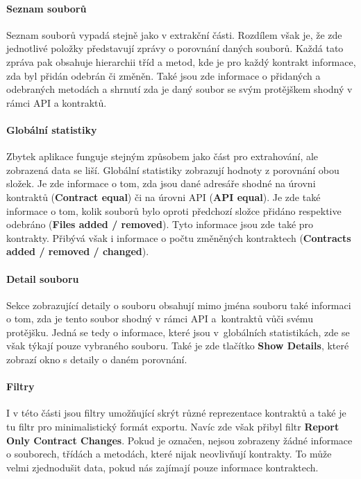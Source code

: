 		\paragraph{Seznam souborů}
			Seznam souborů vypadá stejně jako v extrakční části. Rozdílem však je, že zde jednotlivé položky představují zprávy o porovnání daných souborů. Každá tato zpráva pak obsahuje hierarchii tříd a metod, kde je pro každý kontrakt informace, zda byl přidán odebrán či změněn. Také jsou zde informace o přidaných a odebraných metodách a shrnutí zda je daný soubor se svým protějškem shodný v rámci API a kontraktů.
		
		\paragraph{Globální statistiky}
			Zbytek aplikace funguje stejným způsobem jako část pro extrahování, ale zobrazená data se liší. Globální statistiky zobrazují hodnoty z porovnání obou složek. Je zde informace o tom, zda jsou dané adresáře shodné na úrovni kontraktů (\textbf{Contract equal}) či na úrovni API (\textbf{API equal}). Je zde také informace o tom, kolik souborů bylo oproti předchozí složce přidáno respektive odebráno (\textbf{Files added / removed}). Tyto informace jsou zde také pro kontrakty. Přibývá však i informace o počtu změněných kontraktech (\textbf{Contracts added / removed / changed}).\\
		
		\paragraph{Detail souboru}
			Sekce zobrazující detaily o souboru obsahují mimo jména souboru také informaci o tom, zda je tento soubor shodný v rámci API a~kontraktů vůči svému protějšku. Jedná se tedy o informace, které jsou v~globálních statistikách, zde se však týkají pouze vybraného souboru. Také je zde tlačítko \textbf{Show Details}, které zobrazí okno s detaily o daném porovnání.\\
				
		\paragraph{Filtry}
			I v této části jsou filtry umožňující skrýt různé reprezentace kontraktů a také je tu filtr pro minimalistický formát exportu. Navíc zde však přibyl filtr \textbf{Report Only Contract Changes}. Pokud je označen, nejsou zobrazeny žádné informace o souborech, třídách a metodách, které nijak neovlivňují kontrakty. To může velmi zjednodušit data, pokud nás zajímají pouze informace  kontraktech.\\
			
